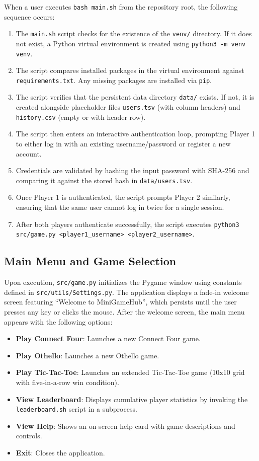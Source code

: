 \documentclass[12pt,a4paper]{article}
\begin{document}
When a user executes \texttt{bash main.sh} from the repository root, the following sequence occurs:

\begin{enumerate}
    \item The \texttt{main.sh} script checks for the existence of the \texttt{venv/} directory. If it does not exist, a Python virtual environment is created using \texttt{python3 -m venv venv}.
    \item The script compares installed packages in the virtual environment against \texttt{requirements.txt}. Any missing packages are installed via \texttt{pip}.
    \item The script verifies that the persistent data directory \texttt{data/} exists. If not, it is created alongside placeholder files \texttt{users.tsv} (with column headers) and \texttt{history.csv} (empty or with header row).
    \item The script then enters an interactive authentication loop, prompting Player 1 to either log in with an existing username/password or register a new account.
    \item Credentials are validated by hashing the input password with SHA-256 and comparing it against the stored hash in \texttt{data/users.tsv}.
    \item Once Player 1 is authenticated, the script prompts Player 2 similarly, ensuring that the same user cannot log in twice for a single session.
    \item After both players authenticate successfully, the script executes \texttt{python3 src/game.py <player1\_username> <player2\_username>}.
\end{enumerate}

\subsection{Main Menu and Game Selection}

Upon execution, \texttt{src/game.py} initializes the Pygame window using constants defined in \texttt{src/utils/Settings.py}. The application displays a fade-in welcome screen featuring ``Welcome to MiniGameHub'', which persists until the user presses any key or clicks the mouse. After the welcome screen, the main menu appears with the following options:

\begin{itemize}
    \item \textbf{Play Connect Four}: Launches a new Connect Four game.
    \item \textbf{Play Othello}: Launches a new Othello game.
    \item \textbf{Play Tic-Tac-Toe}: Launches an extended Tic-Tac-Toe game (10x10 grid with five-in-a-row win condition).
    \item \textbf{View Leaderboard}: Displays cumulative player statistics by invoking the \texttt{leaderboard.sh} script in a subprocess.
    \item \textbf{View Help}: Shows an on-screen help card with game descriptions and controls.
    \item \textbf{Exit}: Closes the application.
\end{itemize}
\end{document}
